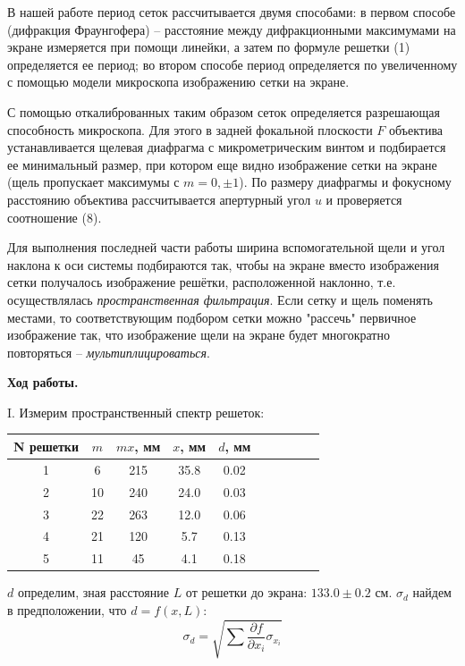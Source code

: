 \documentclass[14pt]{article}
\begin{document}
В нашей работе период сеток рассчитывается двумя способами: в первом способе (дифракция Фраунгофера) --
расстояние между дифракционными максимумами на экране измеряется при помощи линейки, а затем по формуле
решетки (1) определяется ее период; во втором способе период определяется по увеличенному с помощью модели
микроскопа изображению сетки на экране.

С помощью откалиброванных таким образом сеток определяется разрешающая способность микроскопа.
Для этого в задней фокальной плоскости $F$ объектива устанавливается щелевая диафрагма с микрометрическим
винтом и подбирается ее минимальный размер, при котором еще видно изображение сетки на экране (щель пропускает
максимумы с $m = 0, \pm 1$). По размеру диафрагмы и фокусному расстоянию объектива рассчитывается апертурный угол
$u$ и проверяется соотношение (8).

Для выполнения последней части работы ширина вспомогательной щели и угол наклона к оси системы подбираются так,
чтобы на экране вместо изображения сетки получалось изображение решётки, расположенной наклонно, т.е.
осуществлялась \textsl{пространственная фильтрация}. Если сетку
и щель поменять местами, то соответствующим подбором сетки можно "рассечь" первичное изображение так, что изображение щели
на экране будет многократно повторяться -- \textsl{мультиплицироваться}.

\vspace{1cm}
\textbf{Ход работы.}

\vspace{0.5cm}
I. Измерим пространственный спектр решеток:

\begin{center}
\begin{tabular}{|c|c|c|c|c|c|c|c|c|c|}
\hline
N решетки	&	$m$		&	$mx$, мм	&	$x$, мм	&	$d$, мм	\\
\hline
1			&	6		&	215			&	35.8	&	0.02	\\
\hline
2			&	10		&	240			&	24.0	&	0.03	\\
\hline
3			&	22		&	263			&	12.0	&	0.06	\\
\hline
4			&	21		&	120			&	5.7		&	0.13	\\
\hline
5			&	11		&	45			&	4.1		&	0.18	\\
\hline
\end{tabular}
\end{center}

$d$ определим, зная расстояние $L$ от решетки до экрана: $133.0 \pm 0.2$ см. $\sigma_d$ найдем в предположении, что $d = f(x, L)$:
$$
	\sigma_d = \sqrt{\sum \frac{\partial f}{\partial x_i}\sigma_{x_i}}
$$
\end{document}
